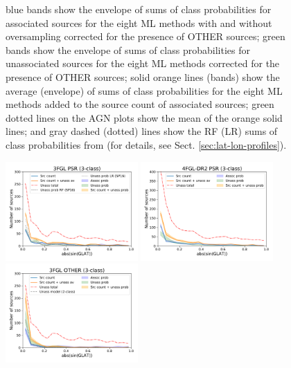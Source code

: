 \documentclass[referee]{aa} %
\begin{document}
\begin{figure}[h]
{blue bands show the envelope of sums of class probabilities for associated sources for the eight ML methods with and without oversampling
corrected for the presence of OTHER sources; 
green bands show the envelope of sums of class probabilities for unassociated sources for the eight ML methods corrected for the presence of OTHER sources; 
solid orange lines (bands) show the average (envelope) of sums of class probabilities for the eight ML methods added to the source count of associated sources; 
green dotted lines on the AGN plots show the mean of the orange solid lines; and gray dashed (dotted) lines show the RF (LR) sums of class probabilities from \cite{2016ApJ...820....8S} (for details, see Sect. \ref{sec:lat-lon-profiles}). }  
\label{fig:lat_profile}
\end{figure}

\begin{figure}[h]
\centering
\includegraphics[width=0.45\textwidth]{plots/lat_profile_PSR_3FGL_3classes.pdf}
\includegraphics[width=0.45\textwidth]{plots/lat_profile_PSR_4FGL-DR2_3classes.pdf} \\
\includegraphics[width=0.45\textwidth]{plots/lat_profile_OTHER_3FGL_3classes.pdf}

\end{figure}
\end{document}
